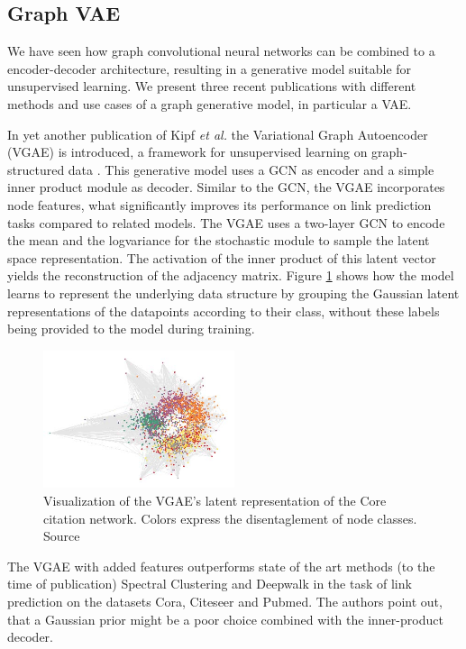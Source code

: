\subsection{Graph VAE}
We have seen how graph convolutional neural networks can be combined to a encoder-decoder architecture, resulting in a generative model suitable for unsupervised learning. We present three recent publications with different methods and use cases of a graph generative model, in particular a VAE.

In yet another publication of Kipf \textit{et al.} the Variational Graph Autoencoder (VGAE) is introduced, a framework for unsupervised learning on graph-structured data \cite{kipf_variational_2016}. This generative model uses a GCN as encoder and a simple inner product module as decoder. Similar to the GCN, the VGAE incorporates node features, what significantly improves its performance on link prediction tasks compared to related models. The VGAE uses a two-layer GCN to encode the mean and the logvariance for the stochastic module to sample the latent space representation. The activation of the inner product of this latent vector yields the reconstruction of the adjacency matrix. Figure \ref{fig:kipfGVAE} shows how the model learns to represent the underlying data structure by grouping the Gaussian latent representations of the datapoints according to their class, without these labels being provided to the model during training.

\begin{figure}[h]
    \centering
    \includegraphics[width=0.5\textwidth]{data/images/KipGVAE.jpg}
    \caption{Visualization of the VGAE's latent representation of the Core citation network. Colors express the disentaglement of node classes. Source \cite{kipf_variational_2016}}
    \label{fig:kipfGVAE}
\end{figure}

The VGAE with added features outperforms state of the art methods (to the time of publication) Spectral Clustering \cite{tang2011leveraging} and Deepwalk \cite{perozzi2014deepwalk} in the task of link prediction on the datasets Cora, Citeseer and Pubmed. The authors point out, that a Gaussian prior might be a poor choice combined with the inner-product decoder.

